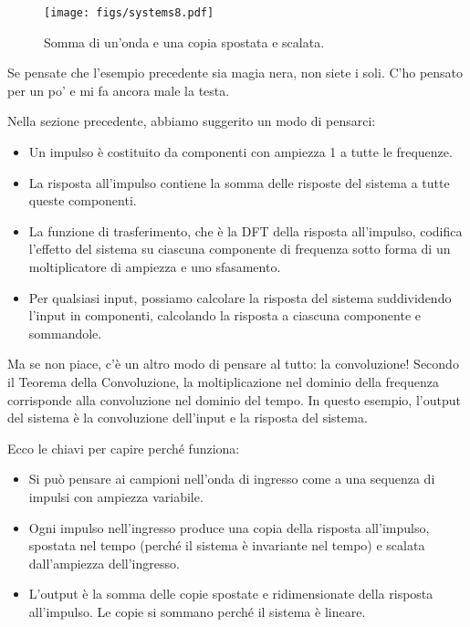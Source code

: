 \documentclass[12pt,a4paper]{book}
\begin{document}
\begin{figure} 

\centerline{\texttt{[image: figs/systems8.pdf]}} \caption{Somma di un'onda e una copia spostata e scalata.} \label{fig.systems8} \end{figure} 

Se pensate che l'esempio precedente sia magia nera, non siete i soli. C'ho pensato per un po' e mi fa ancora male la testa.

Nella sezione precedente, abbiamo suggerito un modo di pensarci:

\begin{itemize} 

\item Un impulso è costituito da componenti con ampiezza 1 a tutte le frequenze.

\item La risposta all'impulso contiene la somma delle risposte del sistema a tutte queste componenti.

\item La funzione di trasferimento, che è la DFT della risposta all'impulso, codifica l'effetto del sistema su ciascuna componente di frequenza sotto forma di un moltiplicatore di ampiezza e uno sfasamento.

\item Per qualsiasi input, possiamo calcolare la risposta del sistema suddividendo l'input in componenti, calcolando la risposta a ciascuna componente e sommandole.

\end{itemize} 

Ma se non piace, c'è un altro modo di pensare al tutto: la convoluzione! Secondo il Teorema della Convoluzione, la moltiplicazione nel dominio della frequenza corrisponde alla convoluzione nel dominio del tempo. In questo esempio, l'output del sistema è la convoluzione dell'input e la risposta del sistema.

Ecco le chiavi per capire perché funziona:

\begin{itemize} 

\item Si può pensare ai campioni nell'onda di ingresso come a una sequenza di impulsi con ampiezza variabile.

\item Ogni impulso nell'ingresso produce una copia della risposta all'impulso, spostata nel tempo (perché il sistema è invariante nel tempo) e scalata dall'ampiezza dell'ingresso.

\item L'output è la somma delle copie spostate e ridimensionate della risposta all'impulso. Le copie si sommano perché il sistema è lineare.

\end{itemize} 
\end{document}
